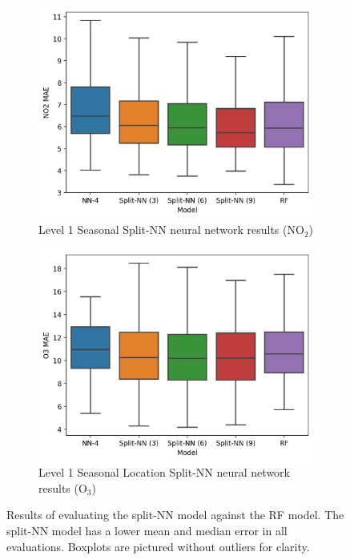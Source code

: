 \documentclass[journal abbreviation, manuscript]{copernicus}
\newcommand{\textus}[1]{$_{\text{#1}}$}
\begin{document}
\begin{figure}[H]
\begin{subfigure}{0.45\textwidth}
\includegraphics[width=\textwidth]{results/split-no2-seasonal-mae}
\caption{Level 1 Seasonal Split-NN neural network results (NO\textus{2})}
\end{subfigure}
\begin{subfigure}{0.45\textwidth}
\includegraphics[width=\textwidth]{results/split-o3-seasonal-mae}
\caption{Level 1 Seasonal Location Split-NN neural network results (O\textus{3})}
\end{subfigure}
\caption{Results of evaluating the split-NN model against the RF model. The split-NN model has a lower mean and median error in all evaluations. Boxplots are pictured without outliers for clarity.}
\label{fig:split-results}
\end{figure}
\end{document}
